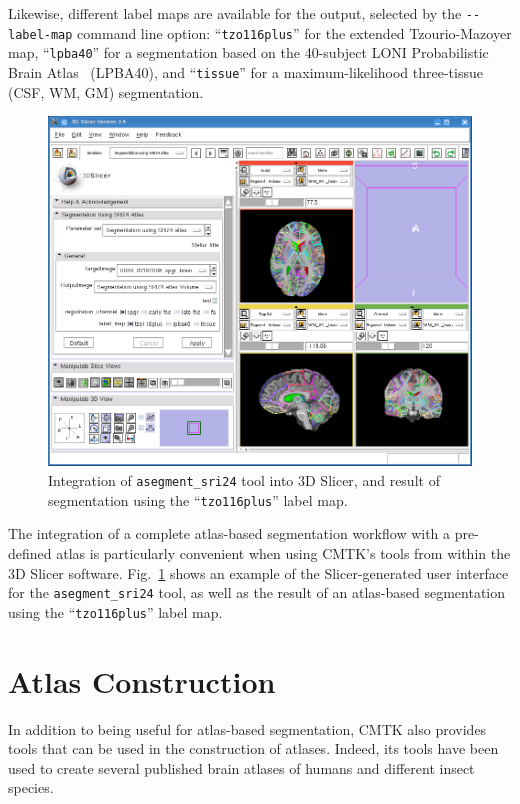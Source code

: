 \documentclass{InsightArticle}
\begin{document}
Likewise, different label maps are available for the output, selected by the
\verb|--label-map| command line option: ``\verb|tzo116plus|'' for the extended
Tzourio-Mazoyer map, ``\verb|lpba40|'' for a segmentation based on the
40-subject LONI Probabilistic Brain Atlas~\cite{ShatMirzAdis:2008} (LPBA40),
 and ``\verb|tissue|'' for a maximum-likelihood
three-tissue (CSF, WM, GM) segmentation.

\begin{figure}[tb]
\centerline{\includegraphics[width=\linewidth]{img/slicer-asegment_sri24}}
\caption{Integration of {\tt asegment\_sri24} tool into 3D Slicer, and result
  of segmentation using the ``{\tt tzo116plus}'' label map.}
\label{fig:SlicerSRI24}
\end{figure}

The integration of a complete atlas-based segmentation workflow with a
pre-defined atlas is particularly convenient when using CMTK's tools from
within the  3D
Slicer software. Fig.~\ref{fig:SlicerSRI24} shows an
example of the Slicer-generated user interface for the \verb|asegment_sri24|
tool, as well as the result of an atlas-based segmentation using the
``\verb|tzo116plus|'' label map.

\clearpage
\section{Atlas Construction}

In addition to being useful for atlas-based segmentation, CMTK also provides
tools that can be used in the construction of atlases. Indeed, its tools have
been used to create several published brain atlases of humans and different
insect species.
\end{document}
